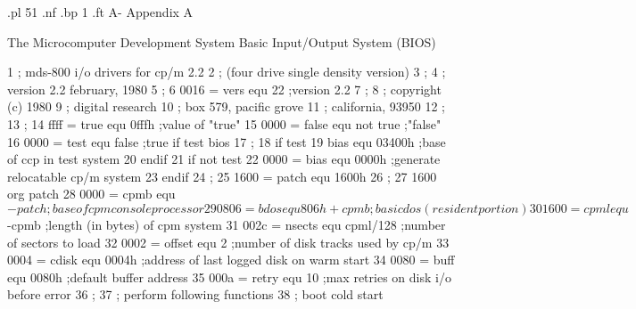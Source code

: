 .pl 51
.nf
.bp 1
.ft                                                       A-%
                                                       Appendix A

                                         The Microcomputer Development System Basic Input/Output System (BIOS)



  1                       ;        mds-800 i/o drivers for cp/m 2.2
  2                       ;        (four drive single density version)
  3                       ;
  4                       ;        version 2.2 february, 1980
  5                       ;
  6      0016 =           vers     equ   22             ;version 2.2
  7                       ;
  8                       ;        copyright (c) 1980
  9                       ;        digital research
 10                       ;        box 579, pacific grove
 11                       ;        california, 93950
 12                       ;
 13                       ;
 14      ffff =           true     equ      0fffh      ;value of "true"
 15      0000 =           false    equ      not true   ;"false"
 16      0000 =           test     equ      false      ;true if test bios
 17                       ;
 18                                if       test
 19                       bias     equ      03400h     ;base of ccp in test system
 20                                endif
 21                                if       not test
 22      0000 =           bias     equ      0000h      ;generate relocatable cp/m system
 23                                endif
 24                       ;
 25      1600 =           patch    equ      1600h
 26                       ;
 27      1600                      org      patch
 28      0000 =           cpmb     equ      $-patch    ;base of cpm console processor
 29      0806 =           bdos     equ      806h+cpmb  ;basic dos (resident portion)
 30      1600 =           cpml     equ      $-cpmb     ;length (in bytes) of cpm system
 31      002c =           nsects   equ      cpml/128   ;number of sectors to load
 32      0002 =           offset   equ      2          ;number of disk tracks used by cp/m
 33      0004 =           cdisk    equ      0004h      ;address of last logged disk on warm start
 34      0080 =           buff     equ      0080h      ;default buffer address
 35      000a =           retry    equ      10         ;max retries on disk i/o before error
 36                       ;
 37                       ;        perform following functions
 38                       ;        boot     cold start
